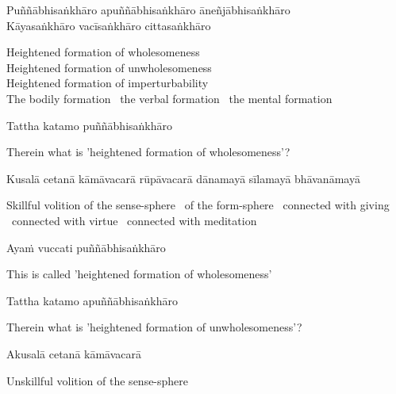 Puññābhisaṅkhāro apuññābhisaṅkhāro āneñjābhisaṅkhāro\\
Kāyasaṅkhāro vacīsaṅkhāro cittasaṅkhāro

\begin{cprenglish}
  Heightened formation of wholesomeness\\
  Heightened formation of unwholesomeness\\
  Heightened formation of imperturbability\\
  The bodily formation \breathmark\ the verbal formation \breathmark\ the mental formation
\end{cprenglish}

Tattha katamo puññābhisaṅkhāro

\begin{cprenglish}
  Therein what is 'heightened formation of wholesomeness'?
\end{cprenglish}

Kusalā cetanā kāmāvacarā rūpāvacarā dānamayā sīlamayā bhāvanāmayā

\begin{cprenglish}
  Skillful volition of the sense-sphere \breathmark\ of the form-sphere \breathmark\ connected with giving \breathmark\ connected with virtue \breathmark\ connected with meditation
\end{cprenglish}

Ayaṁ vuccati puññābhisaṅkhāro

\begin{cprenglish}
  This is called 'heightened formation of wholesomeness'
\end{cprenglish}

Tattha katamo apuññābhisaṅkhāro

\begin{cprenglish}
  Therein what is 'heightened formation of unwholesomeness'?
\end{cprenglish}

Akusalā cetanā kāmāvacarā

\begin{cprenglish}
  Unskillful volition of the sense-sphere
\end{cprenglish}

